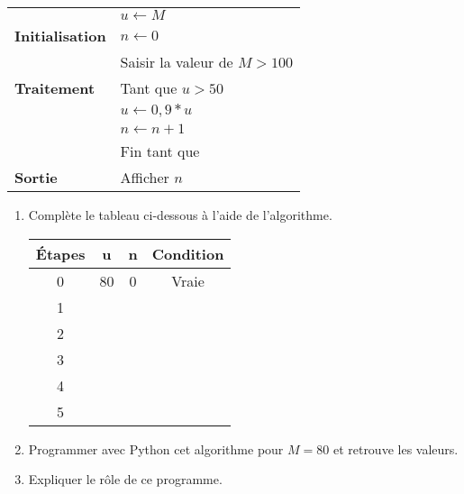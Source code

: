 
\begin{minipage}{0.48\linewidth}
\begin{center}
\begin{tabularx}{\linewidth}{|l|X|}\hline
&$u \longleftarrow M$\\
\textbf{Initialisation}& $n \longleftarrow 0$ \\ 
&Saisir la valeur de $M > 100$\\ \hline
\textbf{Traitement}&Tant que $u > 50$\\
&$u \longleftarrow 0,9*u$\\
&$n \longleftarrow n+1$\\
&Fin tant que\\ \hline
\textbf{Sortie}& Afficher $n$\\ \hline
\end{tabularx}
\end{center}
\end{minipage}
\hfill
\begin{minipage}{0.48\linewidth}
	\begin{enumerate}
		\item Complète le tableau ci-dessous à l'aide de l'algorithme.
		
		\begin{tabular}{|c|c|c|c|}
		\hline 
		Étapes & u & n & Condition \\ 
		\hline 
		 0 & 80 & 0 & Vraie \\ 
		\hline 
		 1 &  &  &  \\ 		
		\hline 
		 2 &  &  &  \\ 		
		\hline 
		 3 &  &  &  \\ 		
		\hline 
		 4 &  &  &  \\ 		
		\hline 
		 5 &  &  &  \\ 		
		\hline 
		\end{tabular} 
		\item Programmer avec Python cet algorithme pour $M = 80$ et retrouve les valeurs.
			\item Expliquer le rôle de ce programme.
	\end{enumerate}
\end{minipage}
